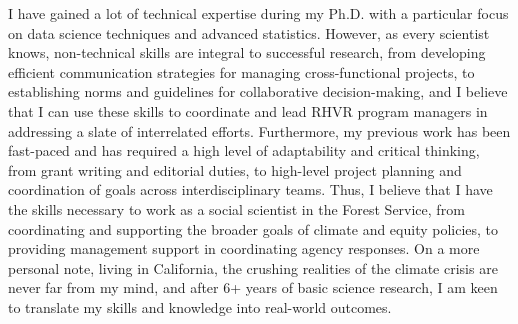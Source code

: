 \documentclass[9pt, a4paper]{maedbh-cv}
\begin{document}
\begin{cvletter}
I have gained a lot of technical expertise during my Ph.D. with a particular focus on data science techniques and advanced statistics. However, as every scientist knows, non-technical skills are integral to successful research, from developing efficient communication strategies for managing cross-functional projects, to establishing norms and guidelines for collaborative decision-making, and I believe that I can use these skills to coordinate and lead RHVR program managers in addressing a slate of interrelated efforts. Furthermore, my previous work has been fast-paced and has required a high level of adaptability and critical thinking, from grant writing and editorial duties, to high-level project planning and coordination of goals across interdisciplinary teams. Thus, I believe that I have the skills necessary to work as a social scientist in the Forest Service, from coordinating and supporting the broader goals of climate and equity policies, to providing management support in coordinating agency responses. On a more personal note, living in California, the crushing realities of the climate crisis are never far from my mind, and after 6+ years of basic science research, I am keen to translate my skills and knowledge into real-world outcomes.
 

\end{cvletter}

\makeletterclosing
\end{document}
